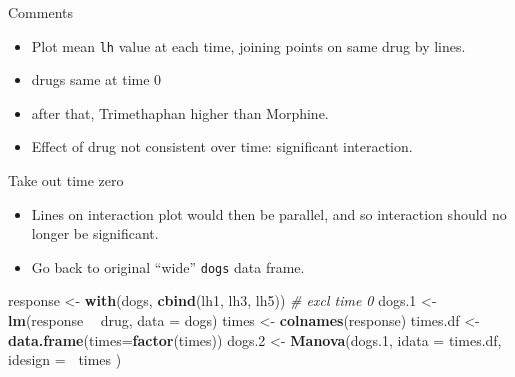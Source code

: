 \documentclass[
  ignorenonframetext,
]{beamer}
\newenvironment{Shaded}{\begin{snugshade}}{\end{snugshade}}
\newcommand{\CommentTok}[1]{\textcolor[rgb]{0.56,0.35,0.01}{\textit{#1}}}
\newcommand{\DataTypeTok}[1]{\textcolor[rgb]{0.13,0.29,0.53}{#1}}
\newcommand{\FloatTok}[1]{\textcolor[rgb]{0.00,0.00,0.81}{#1}}
\newcommand{\KeywordTok}[1]{\textcolor[rgb]{0.13,0.29,0.53}{\textbf{#1}}}
\newcommand{\NormalTok}[1]{#1}
\newcommand{\OperatorTok}[1]{\textcolor[rgb]{0.81,0.36,0.00}{\textbf{#1}}}
\newcommand{\StringTok}[1]{\textcolor[rgb]{0.31,0.60,0.02}{#1}}
\begin{document}
\begin{frame}[fragile]{Comments}
\protect\hypertarget{comments-23}{}

\begin{itemize}
\item
  Plot mean \texttt{lh} value at each time, joining points on same drug
  by lines.
\item
  drugs same at time 0
\item
  after that, Trimethaphan higher than Morphine.
\item
  Effect of drug not consistent over time: significant interaction.
\end{itemize}

\end{frame}

\begin{frame}[fragile]{Take out time zero}
\protect\hypertarget{take-out-time-zero}{}

\begin{itemize}
\item
  Lines on interaction plot would then be parallel, and so interaction
  should no longer be significant.
\item
  Go back to original ``wide'' \texttt{dogs} data frame.
\end{itemize}

\begin{Shaded}
\begin{Highlighting}[]
\NormalTok{response <-}\StringTok{ }\KeywordTok{with}\NormalTok{(dogs, }\KeywordTok{cbind}\NormalTok{(lh1, lh3, lh5)) }\CommentTok{# excl time 0}
\NormalTok{dogs}\FloatTok{.1}\NormalTok{ <-}\StringTok{ }\KeywordTok{lm}\NormalTok{(response }\OperatorTok{~}\StringTok{ }\NormalTok{drug, }\DataTypeTok{data =}\NormalTok{ dogs)}
\NormalTok{times <-}\StringTok{ }\KeywordTok{colnames}\NormalTok{(response)}
\NormalTok{times.df <-}\StringTok{ }\KeywordTok{data.frame}\NormalTok{(}\DataTypeTok{times=}\KeywordTok{factor}\NormalTok{(times))}
\NormalTok{dogs}\FloatTok{.2}\NormalTok{ <-}\StringTok{ }\KeywordTok{Manova}\NormalTok{(dogs}\FloatTok{.1}\NormalTok{,}
  \DataTypeTok{idata =}\NormalTok{ times.df,}
  \DataTypeTok{idesign =} \OperatorTok{~}\NormalTok{times}
\NormalTok{)}
\end{Highlighting}
\end{Shaded}

\end{frame}
\end{document}
